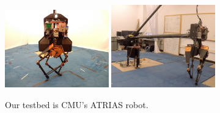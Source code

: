 \begin{figure}
    \centering
    \includegraphics[width = 0.4\textwidth]{img/atrias1.jpg}
    \includegraphics[width = 0.4\textwidth]{img/atrias_dog5d_walking_around_boom.jpg}
    \caption{\small{Our testbed is CMU's ATRIAS robot. 
    }}
        \vspace{-5mm}
    \label{fig:atrias}
\end{figure}

